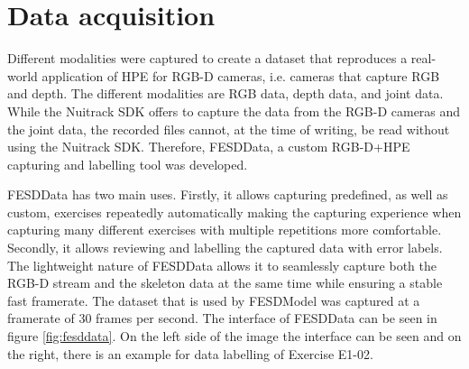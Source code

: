 \section{Data acquisition}
\label{sec:data_acquisition}

Different modalities were captured to create a dataset that reproduces a real-world application of HPE for RGB-D cameras, i.e. cameras that capture RGB and depth. The different modalities are RGB data, depth data, and joint data. While the Nuitrack SDK offers to capture the data from the RGB-D cameras and the joint data, the recorded files cannot, at the time of writing, be read without using the Nuitrack SDK. Therefore, FESDData, a custom RGB-D+HPE capturing and labelling tool was developed. 

FESDData has two main uses. Firstly, it allows capturing predefined, as well as custom, exercises repeatedly automatically making the capturing experience when capturing many different exercises with multiple repetitions more comfortable. Secondly, it allows reviewing and labelling the captured data with error labels. The lightweight nature of FESDData allows it to seamlessly capture both the RGB-D stream and the skeleton data at the same time while ensuring a stable fast framerate. The dataset that is used by FESDModel was captured at a framerate of 30 frames per second. The interface of FESDData can be seen in figure \ref{fig:fesddata}. On the left side of the image the interface can be seen and on the right, there is an example for data labelling of Exercise E1-02.



